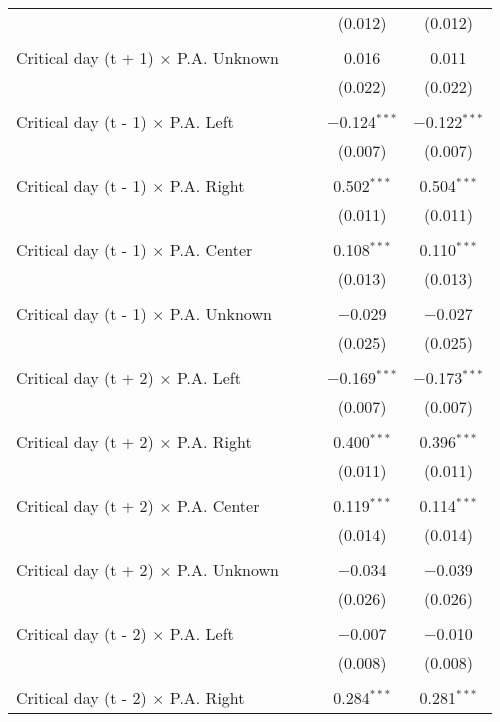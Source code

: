 \documentclass[
]{article}
\begin{document}
\begin{table}[!htbp]
{\begin{tabular}{@{\extracolsep{5pt}}lcccc}
  &  &  & (0.012) & (0.012) \\ 
  & & & & \\ 
 Critical day (t + 1) $\times$ P.A. Unknown &  &  & 0.016 & 0.011 \\ 
  &  &  & (0.022) & (0.022) \\ 
  & & & & \\ 
 Critical day (t - 1) $\times$ P.A. Left &  &  & $-$0.124$^{***}$ & $-$0.122$^{***}$ \\ 
  &  &  & (0.007) & (0.007) \\ 
  & & & & \\ 
 Critical day (t - 1) $\times$ P.A. Right &  &  & 0.502$^{***}$ & 0.504$^{***}$ \\ 
  &  &  & (0.011) & (0.011) \\ 
  & & & & \\ 
 Critical day (t - 1) $\times$ P.A. Center &  &  & 0.108$^{***}$ & 0.110$^{***}$ \\ 
  &  &  & (0.013) & (0.013) \\ 
  & & & & \\ 
 Critical day (t - 1) $\times$ P.A. Unknown &  &  & $-$0.029 & $-$0.027 \\ 
  &  &  & (0.025) & (0.025) \\ 
  & & & & \\ 
 Critical day (t + 2) $\times$ P.A. Left &  &  & $-$0.169$^{***}$ & $-$0.173$^{***}$ \\ 
  &  &  & (0.007) & (0.007) \\ 
  & & & & \\ 
 Critical day (t + 2) $\times$ P.A. Right &  &  & 0.400$^{***}$ & 0.396$^{***}$ \\ 
  &  &  & (0.011) & (0.011) \\ 
  & & & & \\ 
 Critical day (t + 2) $\times$ P.A. Center &  &  & 0.119$^{***}$ & 0.114$^{***}$ \\ 
  &  &  & (0.014) & (0.014) \\ 
  & & & & \\ 
 Critical day (t + 2) $\times$ P.A. Unknown &  &  & $-$0.034 & $-$0.039 \\ 
  &  &  & (0.026) & (0.026) \\ 
  & & & & \\ 
 Critical day (t - 2) $\times$ P.A. Left &  &  & $-$0.007 & $-$0.010 \\ 
  &  &  & (0.008) & (0.008) \\ 
  & & & & \\ 
 Critical day (t - 2) $\times$ P.A. Right &  &  & 0.284$^{***}$ & 0.281$^{***}$ \\ 

\end{tabular}}
\end{table}
\end{document}
